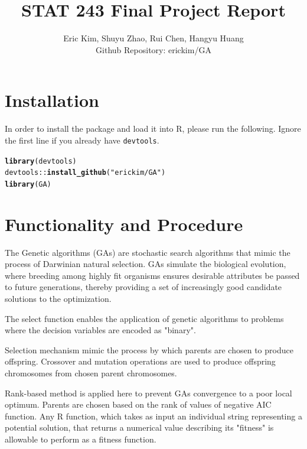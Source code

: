 \documentclass{article}\usepackage[]{graphicx}\usepackage[]{color}
\makeatletter
\newcommand{\hlstr}[1]{\textcolor[rgb]{0.192,0.494,0.8}{#1}}%
\newcommand{\hlopt}[1]{\textcolor[rgb]{0,0,0}{#1}}%
\newcommand{\hlstd}[1]{\textcolor[rgb]{0.345,0.345,0.345}{#1}}%
\newcommand{\hlkwd}[1]{\textcolor[rgb]{0.737,0.353,0.396}{\textbf{#1}}}%
\newenvironment{kframe}{%
 \def\at@end@of@kframe{}%
 \ifinner\ifhmode%
  \def\at@end@of@kframe{\end{minipage}}%
  \begin{minipage}{\columnwidth}%
 \fi\fi%
 \def\FrameCommand##1{\hskip\@totalleftmargin \hskip-\fboxsep
 \colorbox{shadecolor}{##1}\hskip-\fboxsep
     \hskip-\linewidth \hskip-\@totalleftmargin \hskip\columnwidth}%
 \MakeFramed {\advance\hsize-\width
   \@totalleftmargin\z@ \linewidth\hsize
   \@setminipage}}%
 {\par\unskip\endMakeFramed%
 \at@end@of@kframe}
\newenvironment{knitrout}{}{} %
\makeatother
\begin{document}
\title{STAT 243 Final Project Report}
\author{Eric Kim, Shuyu Zhao, Rui Chen, Hangyu Huang \\
Github Repository: erickim/GA}

\maketitle

\section{Installation}
In order to install the package and load it into R, please run the following. Ignore the first line if you already have \texttt{devtools}.
\begin{knitrout}
\color{fgcolor}\begin{kframe}
\begin{alltt}
\hlkwd{library}\hlstd{(devtools)}
\hlstd{devtools}\hlopt{::}\hlkwd{install_github}\hlstd{(}\hlstr{"erickim/GA"}\hlstd{)}
\hlkwd{library}\hlstd{(GA)}
\end{alltt}
\end{kframe}
\end{knitrout}


\section{Functionality and Procedure}
The Genetic algorithms (GAs) are stochastic search algorithms that mimic the process of Darwinian natural selection. GAs simulate the biological evolution, where breeding among highly fit organisms ensures desirable attributes be passed to future generations, thereby providing a set of increasingly good candidate solutions to the optimization.

The select function enables the application of genetic algorithms to problems where the decision variables are encoded as "binary".

Selection mechanism mimic the process by which parents are chosen to produce offspring. Crossover and mutation operations are used to produce offspring chromosomes from chosen parent chromosomes.

Rank-based method is applied here to prevent GAs convergence to a poor local optimum. Parents are chosen based on the rank of values of negative AIC function. Any R function, which takes as input an individual string representing a potential solution, that returns a numerical value describing its "fitness" is allowable to perform as a fitness function.
\end{document}
